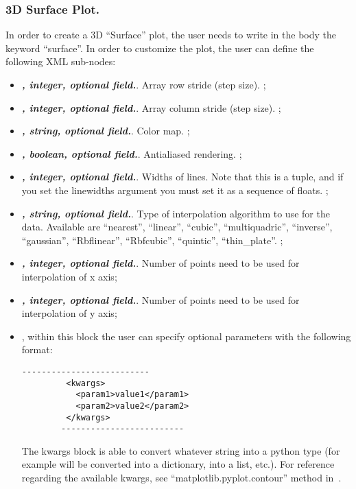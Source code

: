 \subsubsection{3D Surface Plot.}
In order to create a 3D ``Surface'' plot, the user needs to write in the
 body the keyword ``surface''.
%
In order to customize the plot, the user can define the following XML sub-nodes:
  \begin{itemize}
  \item {}\textbf{\textit{, integer, optional field.}}.
  Array row stride (step size).
  ;
  \item {}\textbf{\textit{, integer, optional field.}}.
  Array column stride (step size).
  ;
  \item {}\textbf{\textit{, string, optional field.}}.
  Color map.
  ;
  \item {}\textbf{\textit{, boolean, optional field.}}.
  Antialiased rendering.
  ;
  \item {}\textbf{\textit{, integer, optional field.}}.
  Widths of lines.
  Note that this is a tuple, and if you set the linewidths argument you must set
  it as a sequence of floats.
  ;
  \item {}\textbf{\textit{, string, optional field.}}.
  Type of interpolation algorithm to use for the data.
  Available are ``nearest'', ``linear'', ``cubic'', ``multiquadric'',
  ``inverse'', ``gaussian'', ``Rbflinear'', ``Rbfcubic'', ``quintic'',
  ``thin\_plate''.
  ;
  \item {}\textbf{\textit{, integer, optional field.}}.
  Number of points need to be used for interpolation of x axis;
  \item {}\textbf{\textit{, integer, optional field.}}.
  Number of points need to be used for interpolation of y axis;
  \item \textit{}, within this block the user can specify optional
  parameters with the following format:
        \begin{lstlisting}[style=XML]
        --------------------------
         <kwargs>
           <param1>value1</param1>
           <param2>value2</param2>
         </kwargs>
        -------------------------
       \end{lstlisting}
  The kwargs block is able to convert whatever string into a python type (for
  example  will be converted into a
  dictionary,  into a list, etc.).
  For reference regarding the available kwargs, see
  ``matplotlib.pyplot.contour'' method in~\cite{MatPlotLib}.
    \end{itemize}

